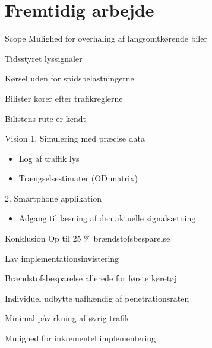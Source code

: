 \section{Fremtidig arbejde}
\begin{frame}{Scope}
Mulighed for overhaling af langsomtkørende biler
\vspace{4mm}

Tidsstyret lyssignaler
\vspace{4mm}

Kørsel uden for spidsbelastningerne
\vspace{4mm}

Bilister kører efter trafikreglerne

\vspace{4mm}
Bilistens rute er kendt

\end{frame}

\begin{frame}{Vision}
1. Simulering med præcise data
	\begin{itemize}
	\item Log af traffik lys
	\item Trængselsestimater (OD matrix)
	\end{itemize}

2. Smartphone applikation
	\begin{itemize}
	\item Adgang til læsning af den aktuelle signalsætning
	\end{itemize}

\end{frame}

\begin{frame}{Konklusion}
Op til 25 \% brændstofsbesparelse
\vspace{4mm}

Lav implementationsinvistering
\vspace{4mm}

Brændstofsbesparelse allerede for første køretøj
\vspace{4mm}

Individuel udbytte uafhændig af penetrationsraten
\vspace{4mm}

Minimal påvirkning af øvrig trafik
\vspace{4mm}

Mulighed for inkrementel implementering
\end{frame}
